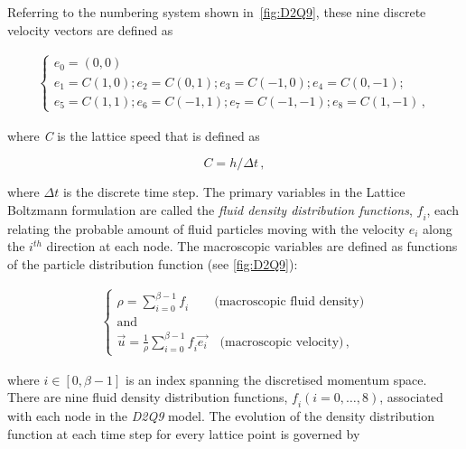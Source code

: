 Referring to the numbering system shown in~\cref{fig:D2Q9}, these nine 
discrete velocity vectors are defined as

\begin{align} 
	\begin{cases}
	\mathit{e_0}=(0,0)\\
	\mathit{e_1}=\mathit{C}(1,0); \mathit{e_2}=\mathit{C}(0,1); 
	\mathit{e_3}=\mathit{C}(-1,0); \mathit{e_4}=\mathit{C}(0,-1); \\
	\mathit{e_5}=\mathit{C}(1,1); \mathit{e_6}=\mathit{C}(-1,1);  
	\mathit{e_7}=\mathit{C}(-1,-1); \mathit{e_8}=\mathit{C}(1,-1)\,, 
	\end{cases}
\end{align}

\noindent where \textit{C} is the lattice speed that is defined as

\begin{equation}
	\mathit{C}=\mathit{h}/\Delta t \,,
\end{equation}

\noindent where $\Delta \mathit{t}$ is the discrete time step. The primary 
variables in the Lattice Boltzmann formulation are called the \textit{fluid 
density distribution functions}, $\mathit{f_i}$, each relating the probable 
amount of fluid particles moving with the velocity $\mathit{e_i}$ along the 
$\mathit{i^{th}}$ direction at each node. The macroscopic variables are defined 
as functions of the particle distribution function (see \cref{fig:D2Q9}):

\begin{align} 
	\label{eq:lbm_macroscopic}	
	\begin{cases}
	\rho = \sum\limits_{\mathit{i}=0}^{\beta - 1}{\mathit{f_i}} \qquad 
	\mbox{(macroscopic fluid density)} \\ 
	\mbox{and}\\
	\overrightarrow{\mathit{u}} = \frac{1}{\rho} 
	\sum\limits_{\mathit{i}=0}^{\beta 
	-1}{\mathit{f_i}\overrightarrow{\mathit{e_i}}} \quad \mbox{(macroscopic 
	velocity)}\,,
	\end{cases}	
\end{align} 

\noindent where $\mathit{i} \in [0, \beta -1]$ is an index spanning the 
discretised momentum space. There are nine fluid density distribution 
functions, $\mathit{f_i}(\mathit{i}=0,\dots,8)$, associated with each node in 
the \textit{D2Q9} model. The evolution of the density distribution function at 
each time step for every lattice point is governed by

